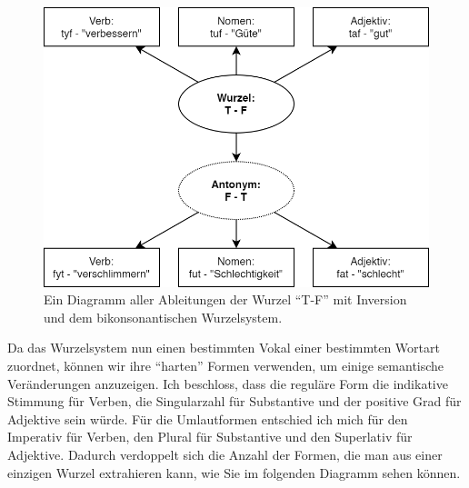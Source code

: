 \documentclass{article}
\begin{document}
\begin{figure}
	\centering
	\includegraphics[scale=0.33]{root_derivations_1.png}
	\caption{Ein Diagramm aller Ableitungen der Wurzel ``T-F'' mit Inversion und dem bikonsonantischen Wurzelsystem.}
	\label{root_derivations_1}
\end{figure}

Da das Wurzelsystem nun einen bestimmten Vokal einer bestimmten Wortart zuordnet, können wir ihre ``harten'' Formen verwenden,
um einige semantische Veränderungen anzuzeigen. Ich beschloss, dass die reguläre Form die indikative Stimmung für Verben,
die Singularzahl für Substantive und der positive Grad für Adjektive sein würde. Für die Umlautformen entschied ich mich
für den Imperativ für Verben, den Plural für Substantive und den Superlativ für Adjektive. Dadurch verdoppelt sich die Anzahl
der Formen, die man aus einer einzigen Wurzel extrahieren kann, wie Sie im folgenden Diagramm sehen können.
\end{document}
